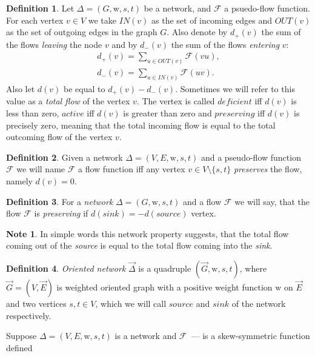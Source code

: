 \documentclass[12pt]{article}
\theoremstyle{definition}
\newtheorem*{note}{Note}
\newtheorem{definition}{Definition}
\newcommand{\wt}{\mathrm{w}}
\newcommand{\flow}{\mathcal{F}}
\newcommand{\source}{\mathit{source}}
\newcommand{\sink}{\mathit{sink}}
\newcommand{\net}{\Delta}
\newcommand{\onet}{\vec{\Delta}}
\numberwithin{remark}{section}
\numberwithin{theorem}{section}
\numberwithin{prop}{section}
\numberwithin{equation}{section}
\numberwithin{lemma}{section}
\numberwithin{prop_under_lemma}{lemma}
\begin{document}
    \begin{definition}
      Let $\net = (G, \wt, s, t)$ be a network, and $\flow$ a psuedo-flow function.
      For each vertex $v \in V$ we take $IN(v)$ as the set of incoming edges
      and $OUT(v)$ as the set of outgoing edges in the graph $G$.
      Also denote by $d_{+}(v)$ the sum of the flows \textit{leaving} the node $v$ and by
      $d_{-}(v)$ the sum of the flows \textit{entering} $v$:
      \begin{align*}
          d_{+}(v) = \sum_{u \in OUT(v)} \flow(vu),\\
          d_{-}(v) = \sum_{u \in IN(v)} \flow(uv).
      \end{align*}
      Also let $d(v)$ be equal to $d_{+}(v) - d_{-}(v)$. Sometimes we will refer to this value as
      a \textit{total flow} of the vertex $v$.
      The vertex is called $deficient$ iff $d(v)$ is less than zero,
      $active$ iff $d(v)$ is greater than zero and
      $preserving$ iff $d(v)$ is precisely zero, meaning that the total incoming flow
      is equal to the total outcoming flow of the vertex $v$.
    \end{definition}
    \begin{definition}
      Given a network $\net = (V, E, \wt, s, t)$ and a pseudo-flow function $\flow$ we will name $\flow$ a flow function iff 
      any vertex $v \in V \setminus \{s,t\}$ \textit{preserves} the flow, namely $d(v) = 0$.
    \end{definition}
    \begin{definition}
      For a \textit{network} $\net = (G, \wt, s, t)$ and a flow $\flow$ we will say,
      that the flow $\flow$ is \textit{preserving} if $d(\mathit{sink}) = -d(\mathit{source})$ vertex.
    \end{definition}
    \begin{note}
      In simple words this network property suggests, 
      that the total flow coming out of the \textit{source} is equal to the total flow
      coming into the \textit{sink}.
    \end{note}
    \begin{definition}
        \textit{Oriented network} $\onet$ is a quadruple $(\vec{G}, \wt, s, t)$, where
        $\vec{G} = (V, \vec{E})$ is weighted oriented graph 
        with a positive weight function $\wt$ on $\vec{E}$ and two vertices $s, t \in V$, which
        we will call $\source$ and $\sink$ of the network respectively.
    \end{definition}
    Suppose $\net = (V, E, \wt, s, t)$ is a network and $\flow$~--- is a skew-symmetric function defined
\end{document}

